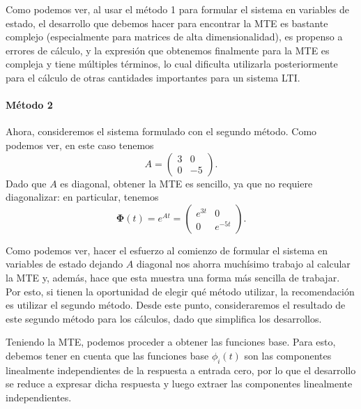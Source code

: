 \documentclass[
  11pt,
  letterpaper,
   addpoints,
   answers
  ]{exam}
\begin{document}
\begin{questions}
\begin{solution}
Como podemos ver, al usar el método 1 para formular el sistema en variables de estado, el desarrollo
que debemos hacer para encontrar la MTE es bastante complejo (especialmente para matrices
de alta dimensionalidad), es propenso a errores de cálculo, y la expresión que obtenemos finalmente
para la MTE es compleja y tiene múltiples términos, lo cual dificulta utilizarla posteriormente para
el cálculo de otras cantidades importantes para un sistema LTI.

\paragraph{Método 2}
Ahora, consideremos el sistema formulado con el segundo método. Como podemos ver,
en este caso tenemos
\begin{equation}
A=\begin{pmatrix}
3 & 0\\
0 & -5
\end{pmatrix}.
\end{equation}
Dado que $A$ es diagonal, obtener la MTE es sencillo, ya que no requiere diagonalizar: en particular,
tenemos
\begin{equation}
\boldsymbol{\Phi}(t)=e^{At}=
\begin{pmatrix}
e^{3t} & 0\\
0 & e^{-5t}
\end{pmatrix}.
\end{equation}

Como podemos ver, hacer el esfuerzo al comienzo de formular el sistema en variables de estado dejando
$A$ diagonal nos ahorra muchísimo trabajo al calcular la MTE y, además, hace que esta
muestra una forma más sencilla de trabajar. Por esto, si tienen la oportunidad de elegir qué
método utilizar, la recomendación es utilizar el segundo método. Desde este punto, consideraremos
el resultado de este segundo método para los cálculos, dado que simplifica los desarrollos.

Teniendo la MTE, podemos proceder a obtener las funciones base. Para esto, debemos tener en
cuenta que las funciones base $\phi_i(t)$ son las componentes linealmente independientes de la
respuesta a entrada cero, por lo que el desarrollo se reduce a expresar dicha respuesta y
luego extraer las componentes linealmente independientes.


\end{solution}
\end{questions}
\end{document}
